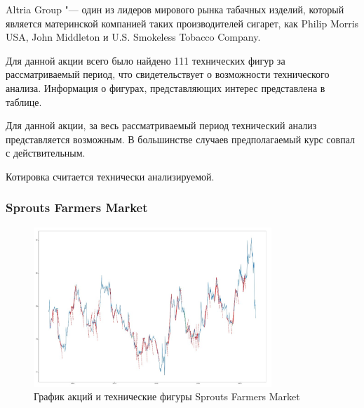 \documentclass[bachelor, och, coursework]{SCWorks}
\begin{document}
        
            Altria Group "--- один из лидеров мирового рынка табачных изделий, 
            который является материнской компанией таких производителей сигарет, 
            как Philip Morris USA, John Middleton и U.S. Smokeless Tobacco 
            Company.
    
        
        Для данной акции всего было найдено 111 технических фигур за 
        рассматриваемый период, что свидетельствует о возможности технического 
        анализа. Информация о фигурах, представляющих интерес представлена в 
        таблице.
        
        Для данной акции, за весь рассматриваемый период технический анализ 
        представляется возможным. В большинстве случаев предполагаемый курс 
        совпал с действительным.
        
        Котировка считается технически анализируемой.

        \subsubsection{Sprouts Farmers Market}
    
        \begin{figure}[H]
            \centering
            \includegraphics[width=0.8\textwidth]{pic/SFM.jpg}
            \caption{График акций и технические фигуры Sprouts Farmers Market}
        \end{figure}
       
\end{document}
